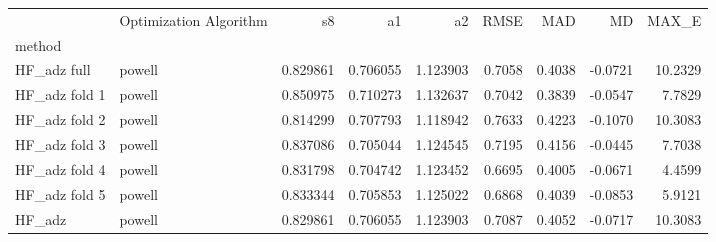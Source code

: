 \begin{tabular}{llrrrrrrr}
 & Optimization Algorithm & s8 & a1 & a2 & RMSE & MAD & MD & MAX_E \\
method &  &  &  &  &  &  &  &  \\
HF_adz full & powell & 0.829861 & 0.706055 & 1.123903 & 0.7058 & 0.4038 & -0.0721 & 10.2329 \\
HF_adz fold 1 & powell & 0.850975 & 0.710273 & 1.132637 & 0.7042 & 0.3839 & -0.0547 & 7.7829 \\
HF_adz fold 2 & powell & 0.814299 & 0.707793 & 1.118942 & 0.7633 & 0.4223 & -0.1070 & 10.3083 \\
HF_adz fold 3 & powell & 0.837086 & 0.705044 & 1.124545 & 0.7195 & 0.4156 & -0.0445 & 7.7038 \\
HF_adz fold 4 & powell & 0.831798 & 0.704742 & 1.123452 & 0.6695 & 0.4005 & -0.0671 & 4.4599 \\
HF_adz fold 5 & powell & 0.833344 & 0.705853 & 1.125022 & 0.6868 & 0.4039 & -0.0853 & 5.9121 \\
HF_adz & powell & 0.829861 & 0.706055 & 1.123903 & 0.7087 & 0.4052 & -0.0717 & 10.3083 \\
\end{tabular}
